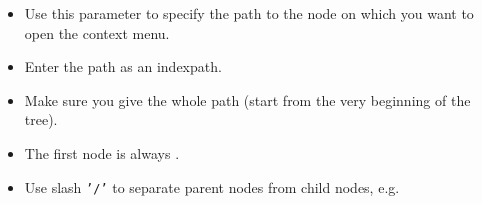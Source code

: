 \begin{itemize}
\item Use this parameter to specify the path to the node on which you want to open the context menu.
\item Enter the path as an indexpath.
\item Make sure you give the whole path (start from the very beginning of the tree).
\item The first node is always . 
\item Use slash {\tt '/'} to separate parent nodes from child nodes, e.g. 
\end{itemize}  
    